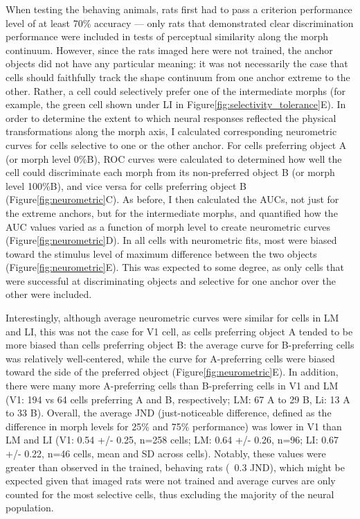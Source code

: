When testing the behaving animals, rats first had to pass a criterion performance level of at least 70\% accuracy --- only rats that demonstrated clear discrimination performance were included in tests of perceptual similarity along the morph continuum. However, since the rats imaged here were not trained, the anchor objects did not have any particular meaning: it was not necessarily the case that cells should faithfully track the shape continuum from one anchor extreme to the other. Rather, a cell could selectively prefer one of the intermediate morphs (for example, the green cell shown under LI in Figure\ref{fig:selectivity_tolerance}E). In order to determine the extent to which neural responses reflected the physical transformations along the morph axis, I calculated corresponding neurometric curves for cells selective to one or the other anchor. For cells preferring object A (or morph level 0\%B), ROC curves were calculated to determined how well the cell could discriminate each morph from its non-preferred object B (or morph level 100\%B), and vice versa for cells preferring object B (Figure\ref{fig:neurometric}C). As before, I then calculated the AUCs, not just for the extreme anchors, but for the intermediate morphs, and quantified how the AUC values varied as a function of morph level to create neurometric curves (Figure\ref{fig:neurometric}D). In all cells with neurometric fits, most were biased toward the stimulus level of maximum difference between the two objects (Figure\ref{fig:neurometric}E). This was expected to some degree, as only cells that were successful at discriminating objects and selective for one anchor over the other were included. 

Interestingly, although average neurometric curves were similar for cells in LM and LI, this was not the case for V1 cell, as cells preferring object A tended to be more biased than cells preferring object B: the average curve for B-preferring cells was relatively well-centered, while the curve for A-preferring cells were biased toward the side of the preferred object (Figure\ref{fig:neurometric}E). In addition, there were many more A-preferring cells than B-preferring cells in V1 and LM (V1: 194 vs 64 cells preferring A and B, respectively; LM: 67 A to 29 B, Li: 13 A to 33 B). Overall, the average JND (just-noticeable difference, defined as the difference in morph levels for 25\% and 75\% performance) was lower in V1 than LM and LI (V1: 0.54 +/- 0.25, n=258 cells; LM:  0.64 +/- 0.26, n=96; LI: 0.67 +/- 0.22, n=46 cells, mean and SD across cells). Notably, these values were greater than observed in the trained, behaving rats (~0.3 JND), which might be expected given that imaged rats were not trained and average curves are only counted for the most selective cells, thus excluding the majority of the neural population.

